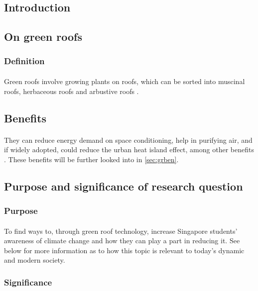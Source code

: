 \documentclass[a4paper]{article}
\begin{document}
\begin{multicols}{2}

  \section{Introduction}
  \subsection{On green roofs}
  \subsubsection{Definition}
  \paragraph{} Green roofs involve growing plants on roofs, which can
  be sorted into muscinal roofs, herbaceous roofs and arbustive roofs
  \parencite{ecoeng}.


  \subsection{Benefits}
  \paragraph{} They can reduce energy demand on space conditioning,
  help in purifying air, and if widely adopted, could reduce the urban
  heat island effect, among other benefits \parencite{energeff}. These
  benefits will be further looked into in \cref{sec:grben}.


  \subsection{Purpose and significance of research question}
  \subsubsection{Purpose}
  \paragraph{} To find ways to, through green roof technology, increase
  Singapore students' awareness of climate change and how they can play
  a part in reducing it. See below for more information as to how this
  topic is relevant to today's dynamic and modern society.

  \subsubsection{Significance}

\end{multicols}
\end{document}
